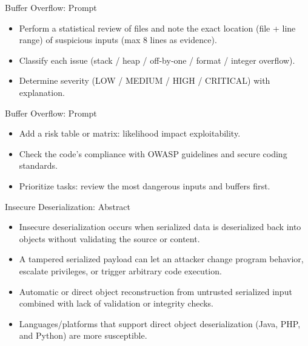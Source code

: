 \documentclass[t,ignorenonframetext]{beamer}
\begin{document}
\begin{frame}{Buffer Overflow: Prompt}
\begin{tcolorbox}
[colback=blue!5!white,colframe=navy!75!black,title=Tasks (Part 1)]
\begin{itemize}
    \item  Perform a statistical review of files and note the exact location (file + line range) of suspicious inputs (max 8 lines as evidence).
    \item Classify each issue (stack / heap / off‑by‑one / format / integer overflow).
    \item Determine severity (LOW / MEDIUM / HIGH / CRITICAL) with explanation.
\end{itemize}
\end{tcolorbox}
\end{frame}

\begin{frame}{Buffer Overflow: Prompt}
\begin{tcolorbox}
[colback=blue!5!white,colframe=navy!75!black,title=Tasks (Part 2)]
\begin{itemize}

\item Add a risk table or matrix: likelihood  impact exploitability.
\item Check the code’s compliance with OWASP guidelines and secure coding standards.
\item Prioritize tasks: review the most dangerous inputs and buffers first.
\end{itemize}
\end{tcolorbox}
\end{frame}

\begin{frame}{Insecure Deserialization: Abstract}
\begin{itemize}
    \item Insecure deserialization occurs when serialized data is deserialized back into objects without validating the source or content.
    \item A tampered serialized payload can let an attacker change program behavior, escalate privileges, or trigger arbitrary code execution.
    \item Automatic or direct object reconstruction from untrusted serialized input combined with lack of validation or integrity checks.
    \item Languages/platforms that support direct object deserialization (Java, PHP, and Python) are more susceptible.
\end{itemize}
\end{frame}
\end{document}
